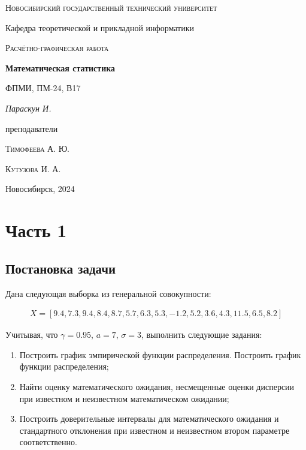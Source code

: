 \documentclass[12pt, a4paper]{article}
\begin{document}
\begin{titlepage}
  \centering
  \textsc{Новосибирский государственный технический университет}\par
  \vspace{1mm}
  Кафедра теоретической и прикладной информатики\par
  \vspace{8cm}
  \textsc{Расчётно-графическая работа}\par
  {\huge\bfseries Математическая статистика\par}
  \vspace{1cm}
  {\scriptsize ФПМИ, ПМ-24, В17\par}
  \vspace{1mm}
  {\itshape\large Параскун И.\par}
  \vfill
  {\small преподаватели\par}
  \vspace{2mm}
  \textsc{Тимофеева А. Ю.}\par
  \vspace{1mm}
  \textsc{Кутузова И. А.}\par
  \vfill
  \large{Новосибирск, 2024}
\end{titlepage}

\newpage
\setcounter{page}{2}

\section{Часть 1}
\subsection{Постановка задачи}
Дана следующая выборка из генеральной совокупности:

\begin{align*}
  X = \left[ 
    9.4, 7.3, 9.4, 8.4, 8.7, 5.7, 6.3, 5.3, 
    -1.2, 5.2, 3.6, 4.3, 11.5, 6.5, 8.2 
  \right]
\end{align*}

\vspace{3mm}

\noindent Учитывая, что $\gamma = 0.95$, $a = 7$, $\sigma = 3$, выполнить следующие
задания:

\begin{enumerate}
  \item Построить график эмпирической функции распределения. 
    Построить график функции распределения;
  \item Найти оценку математического ожидания, несмещенные оценки 
    дисперсии при известном и неизвестном математическом ожидании;
  \item Построить доверительные интервалы для математического ожидания 
    и стандартного отклонения при известном и неизвестном втором параметре 
    соответственно.
\end{enumerate}
\end{document}
